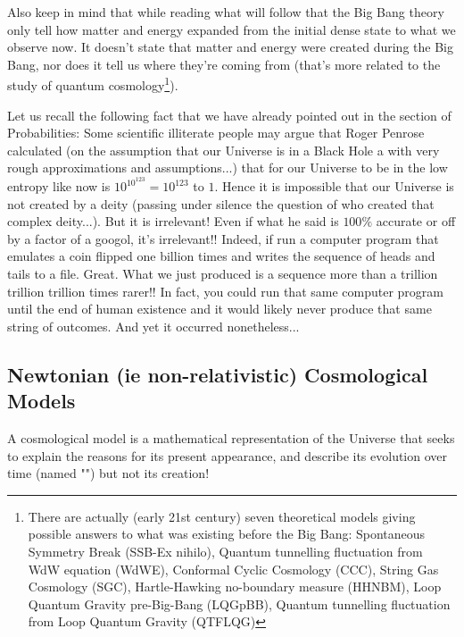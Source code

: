 	Also keep in mind that while reading what will follow that the Big Bang theory only tell how matter and energy expanded from the initial dense state to what we observe now. It doesn't state that matter and energy were created during the Big Bang, nor does it tell us where they're coming from (that's more related to the study of quantum cosmology\footnote{There are actually (early 21st century) seven theoretical models giving possible answers to what was existing before the Big Bang: Spontaneous Symmetry Break (SSB-Ex nihilo), Quantum tunnelling fluctuation from WdW equation (WdWE), Conformal Cyclic Cosmology (CCC), String Gas Cosmology (SGC), Hartle-Hawking no-boundary measure (HHNBM), Loop Quantum Gravity pre-Big-Bang (LQGpBB), Quantum tunnelling fluctuation from Loop Quantum Gravity (QTFLQG)}).
	
	\begin{tcolorbox}[title=Remark,colframe=black,arc=10pt]
	Let us recall the following fact that we have already pointed out in the section of Probabilities: Some scientific illiterate people may argue that Roger Penrose calculated (on the assumption that our Universe is in a Black Hole a with very rough approximations and assumptions...) that for our Universe to be in the low entropy like now is $10^{10^{123}} =10^{123}$ to $1$. Hence it is impossible that our Universe is not created by a deity (passing under silence the question of who created that complex deity...). But it is irrelevant! Even if what he said is $100\%$ accurate or off by a factor of a googol, it's irrelevant!! Indeed, if run a computer program that emulates a coin flipped one billion times and writes the sequence of heads and tails to a file. Great. What we just produced is a sequence more than a trillion trillion trillion times rarer!!  In fact, you could run that same computer program until the end of human existence and it would likely never produce that same string of outcomes. And yet it occurred nonetheless...
	\end{tcolorbox}
	
	\subsection{Newtonian (ie non-relativistic) Cosmological Models}\label{newtonian cosmological models}
	A cosmological model is a mathematical representation of the Universe that seeks to explain the reasons for its present appearance, and describe its evolution over time (named "") but not its creation!
	

